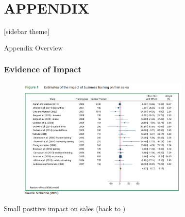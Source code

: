 \documentclass[hideothersubsections, usenames,dvipsnames,11pt]{beamer}
\newenvironment{itemize_2pt}{\itemize\addtolength{\itemsep}{2pt}}{\enditemize}
\begin{document}
\section*{\textbf{APPENDIX}}

[sidebar theme]

\begin{frame}{Appendix Overview}
\end{frame}


\begin{frame}[label=McK2020_sales]
\frametitle{Evidence of Impact}

	\begin{figure}[htbp]
		\centering
		\includegraphics[width=23.2em]{pics/McK2020_sales.png}
		\label{McKenzie(2020): Sales}
	\end{figure}	
	
	\vspace{-1em}	
	
	\begin{itemize_2pt}
		\item Small positive impact on sales (back to \hyperlink{McK2020_profits}{})
	\end{itemize_2pt}
	
\end{frame}
\end{document}
